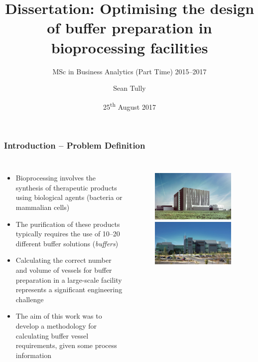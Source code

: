 \documentclass{beamer}
\title[Bioprocessing facilities design]{Dissertation:
    Optimising the design of buffer preparation in bioprocessing facilities}
\subtitle{MSc in Business Analytics (Part Time) 2015--2017}
\author{Sean Tully}
\institute{University College Dublin}
\date{25\textsuperscript{th} August 2017}
\begin{document}

\begin{frame}
    \titlepage
\end{frame}


\begin{frame}
    \frametitle{Introduction -- Problem Definition}
    \begin{columns}
            \begin{itemize}
                \item Bioprocessing involves the synthesis of therapeutic
                    products using biological agents (bacteria or mammalian
                    cells)        
                \item The purification of these products typically requires the
                    use of 10--20 different buffer solutions (\emph{buffers})
                \item Calculating the correct number and volume of vessels for
                    buffer preparation in a large-scale facility represents a
                    significant engineering challenge
                \item The aim of this work was to develop a methodology for
                    calculating buffer vessel requirements, given some process
                    information
            \end{itemize}        
        \begin{figure}
            \centering
            \includegraphics[width=0.95\textwidth]{alexion.jpg}\\
            \vspace{0.3cm}
            \includegraphics[width=0.95\textwidth]{janssen.jpg}

\end{figure}
\end{columns}
\end{frame}
\end{document}
